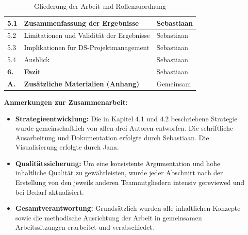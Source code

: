 \begin{table}[H]
\begin{tabular}{|p{1.5cm}|p{7.5cm}|p{5cm}|}
5.1 & Zusammenfassung der Ergebnisse & Sebastiaan \\ \hline
5.2 & Limitationen und Validität der Ergebnisse & Sebastiaan \\ \hline
5.3 & Implikationen für DS-Projektmanagement & Sebastiaan \\ \hline
5.4 & Ausblick & Sebastiaan \\ \hline
        \textbf{6.} & \textbf{Fazit} & Sebastiaan \\ \hline
\textbf{A.} & \textbf{Zusätzliche Materialien (Anhang)} & Gemeinsam \\ \hline
\end{tabular}
\caption{Gliederung der Arbeit und Rollenzuordnung}
    \label{tab:projektorganisation}
\end{table}

\medskip
\noindent
\textbf{Anmerkungen zur Zusammenarbeit:}
\begin{itemize}
    \item[*] \textbf{Strategieentwicklung:} Die in Kapitel 4.1 und 4.2 beschriebene Strategie wurde gemeinschaftlich von allen drei Autoren entworfen. Die schriftliche Ausarbeitung und Dokumentation erfolgte durch Sebastiaan. Die Visualisierung erfolgte durch Jana.
    \item \textbf{Qualitätssicherung:} Um eine konsistente Argumentation und hohe inhaltliche Qualität zu gewährleisten, wurde jeder Abschnitt nach der Erstellung von den jeweils anderen Teammitgliedern intensiv gereviewed und bei Bedarf aktualisiert.
    \item \textbf{Gesamtverantwortung:} Grundsätzlich wurden alle inhaltlichen Konzepte sowie die methodische Ausrichtung der Arbeit in gemeinsamen Arbeitssitzungen erarbeitet und verabschiedet.
\end{itemize}

